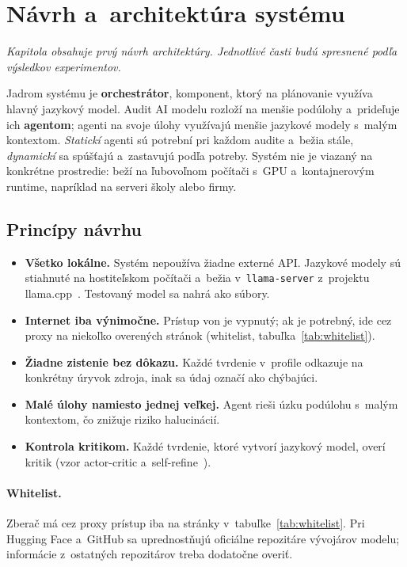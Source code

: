 \section{Návrh a~architektúra systému}
\label{sec:architektura}

\emph{Kapitola obsahuje prvý návrh architektúry. Jednotlivé časti budú
spresnené podľa výsledkov experimentov.}

Jadrom systému je \textbf{orchestrátor}, komponent, ktorý na plánovanie
využíva hlavný jazykový model. Audit AI modelu rozloží na menšie podúlohy
a~prideľuje ich \textbf{agentom}; agenti na svoje úlohy využívajú menšie
jazykové modely s~malým kontextom. \emph{Statickí} agenti sú potrební pri
každom audite a~bežia stále, \emph{dynamickí} sa spúšťajú a~zastavujú
podľa potreby. Systém nie je viazaný na konkrétne prostredie: beží na
ľubovoľnom počítači s~GPU a~kontajnerovým runtime, napríklad na serveri
školy alebo firmy.

\subsection{Princípy návrhu}
\label{sec:principy}

\begin{itemize}
    \item \textbf{Všetko lokálne.} Systém nepoužíva žiadne externé API.
    Jazykové modely sú stiahnuté na hostiteľskom počítači a~bežia
    v~\texttt{llama-server} z~projektu llama.cpp~\cite{llamacpp}. Testovaný
    model sa nahrá ako súbory.
    \item \textbf{Internet iba výnimočne.} Prístup von je vypnutý; ak je
    potrebný, ide cez proxy na niekoľko overených stránok (whitelist,
    tabuľka~\ref{tab:whitelist}).
    \item \textbf{Žiadne zistenie bez dôkazu.} Každé tvrdenie v~profile
    odkazuje na konkrétny úryvok zdroja, inak sa údaj označí ako chýbajúci.
    \item \textbf{Malé úlohy namiesto jednej veľkej.} Agent rieši úzku
    podúlohu s~malým kontextom, čo znižuje riziko halucinácií.
    \item \textbf{Kontrola kritikom.} Každé tvrdenie, ktoré vytvorí
    jazykový model, overí kritik (vzor actor-critic
    a~self-refine~\cite{madaan2023selfrefine}).
\end{itemize}

\paragraph{Whitelist.} Zberač má cez proxy prístup iba na stránky
v~tabuľke~\ref{tab:whitelist}. Pri Hugging Face a~GitHub sa uprednostňujú
oficiálne repozitáre vývojárov modelu; informácie z~ostatných repozitárov
treba dodatočne overiť.

